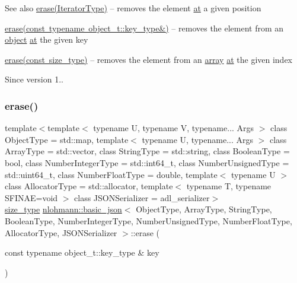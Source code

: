 \begin{DoxySeeAlso}{See also}
\mbox{\hyperlink{classnlohmann_1_1basic__json_a068a16e76be178e83da6a192916923ed}{erase(\+Iterator\+Type)}} -- removes the element \mbox{\hyperlink{classnlohmann_1_1basic__json_a73ae333487310e3302135189ce8ff5d8}{at}} a given position 

\mbox{\hyperlink{classnlohmann_1_1basic__json_a2f8484d69c55d8f2a9697a7bec29362a}{erase(const typename object\+\_\+t\+::key\+\_\+type\&)}} -- removes the element from an \mbox{\hyperlink{classnlohmann_1_1basic__json_a31f84ee15c4690ff705bed74736d04c6}{object}} \mbox{\hyperlink{classnlohmann_1_1basic__json_a73ae333487310e3302135189ce8ff5d8}{at}} the given key 

\mbox{\hyperlink{classnlohmann_1_1basic__json_a88cbcefe9a3f4d294bed0653550a5cb9}{erase(const size\+\_\+type)}} -- removes the element from an \mbox{\hyperlink{classnlohmann_1_1basic__json_a8a7d537fc297bbc5b845f92fe0445e3b}{array}} \mbox{\hyperlink{classnlohmann_1_1basic__json_a73ae333487310e3302135189ce8ff5d8}{at}} the given index
\end{DoxySeeAlso}
\begin{DoxySince}{Since}
version 1.. 
\end{DoxySince}
\mbox{\label{classnlohmann_1_1basic__json_a2f8484d69c55d8f2a9697a7bec29362a}} 
\subsubsection{\texorpdfstring{erase()}{erase()}\hspace{0.1cm}{\footnotesize\ttfamily [3/4]}}
{\footnotesize\ttfamily template$<$template$<$ typename U, typename V, typename... Args $>$ class Object\+Type = std\+::map, template$<$ typename U, typename... Args $>$ class Array\+Type = std\+::vector, class String\+Type  = std\+::string, class Boolean\+Type  = bool, class Number\+Integer\+Type  = std\+::int64\+\_\+t, class Number\+Unsigned\+Type  = std\+::uint64\+\_\+t, class Number\+Float\+Type  = double, template$<$ typename U $>$ class Allocator\+Type = std\+::allocator, template$<$ typename T, typename S\+F\+I\+N\+A\+E=void $>$ class J\+S\+O\+N\+Serializer = adl\+\_\+serializer$>$ \\
\mbox{\hyperlink{classnlohmann_1_1basic__json_a39f2cd0b58106097e0e67bf185cc519b}{size\+\_\+type}} \mbox{\hyperlink{classnlohmann_1_1basic__json}{nlohmann\+::basic\+\_\+json}}$<$ Object\+Type, Array\+Type, String\+Type, Boolean\+Type, Number\+Integer\+Type, Number\+Unsigned\+Type, Number\+Float\+Type, Allocator\+Type, J\+S\+O\+N\+Serializer $>$\+::erase (\begin{DoxyParamCaption}\item[{const typename object\+\_\+t\+::key\+\_\+type \&}]{key }\end{DoxyParamCaption})\hspace{0.3cm}{\ttfamily [inline]}}



